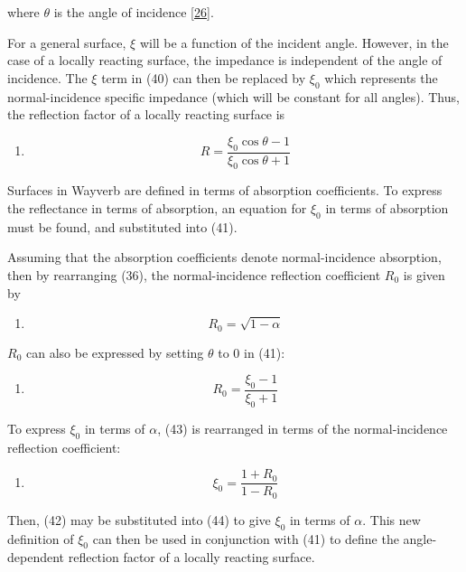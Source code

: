 \documentclass[]{scrreprt}
\providecommand{\tightlist}{%
  \setlength{\itemsep}{0pt}\setlength{\parskip}{0pt}}
\begin{document}
where \(\theta\) is the angle of incidence
{[}\protect\hyperlink{ref-southernux5froomux5f2013}{26}{]}.

For a general surface, \(\xi\) will be a function of the incident angle.
However, in the case of a locally reacting surface, the impedance is
independent of the angle of incidence. The \(\xi\) term in (40) can then
be replaced by \(\xi_0\) which represents the normal-incidence specific
impedance (which will be constant for all angles). Thus, the reflection
factor of a locally reacting surface is

\begin{enumerate}
\def\labelenumi{(\arabic{enumi})}
\setcounter{enumi}{40}
\tightlist
\item
  \[R=\frac{\xi_0\cos\theta-1}{\xi_0\cos\theta+1}\]
\end{enumerate}

Surfaces in Wayverb are defined in terms of absorption coefficients. To
express the reflectance in terms of absorption, an equation for
\(\xi_0\) in terms of absorption must be found, and substituted into
(41).

Assuming that the absorption coefficients denote normal-incidence
absorption, then by rearranging (36), the normal-incidence reflection
coefficient \(R_0\) is given by

\begin{enumerate}
\def\labelenumi{(\arabic{enumi})}
\setcounter{enumi}{41}
\tightlist
\item
  \[R_0=\sqrt{1-\alpha}\]
\end{enumerate}

\(R_0\) can also be expressed by setting \(\theta\) to 0 in (41):

\begin{enumerate}
\def\labelenumi{(\arabic{enumi})}
\setcounter{enumi}{42}
\tightlist
\item
  \[R_0=\frac{\xi_0 -1}{\xi_0 +1}\]
\end{enumerate}

To express \(\xi_0\) in terms of \(\alpha\), (43) is rearranged in terms
of the normal-incidence reflection coefficient:

\begin{enumerate}
\def\labelenumi{(\arabic{enumi})}
\setcounter{enumi}{43}
\tightlist
\item
  \[\xi_0=\frac{1+R_0}{1-R_0}\]
\end{enumerate}

Then, (42) may be substituted into (44) to give \(\xi_0\) in terms of
\(\alpha\). This new definition of \(\xi_0\) can then be used in
conjunction with (41) to define the angle-dependent reflection factor of
a locally reacting surface.
\end{document}
